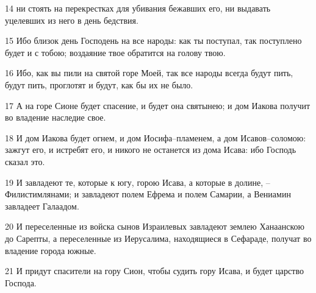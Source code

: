 \par 14 ни стоять на перекрестках для убивания бежавших его, ни выдавать уцелевших из него в день бедствия.
\par 15 Ибо близок день Господень на все народы: как ты поступал, так поступлено будет и с тобою; воздаяние твое обратится на голову твою.
\par 16 Ибо, как вы пили на святой горе Моей, так все народы всегда будут пить, будут пить, проглотят и будут, как бы их не было.
\par 17 А на горе Сионе будет спасение, и будет она святынею; и дом Иакова получит во владение наследие свое.
\par 18 И дом Иакова будет огнем, и дом Иосифа--пламенем, а дом Исавов--соломою: зажгут его, и истребят его, и никого не останется из дома Исава: ибо Господь сказал это.
\par 19 И завладеют те, которые к югу, горою Исава, а которые в долине, --Филистимлянами; и завладеют полем Ефрема и полем Самарии, а Вениамин завладеет Галаадом.
\par 20 И переселенные из войска сынов Израилевых завладеют землею Ханаанскою до Сарепты, а переселенные из Иерусалима, находящиеся в Сефараде, получат во владение города южные.
\par 21 И придут спасители на гору Сион, чтобы судить гору Исава, и будет царство Господа.


